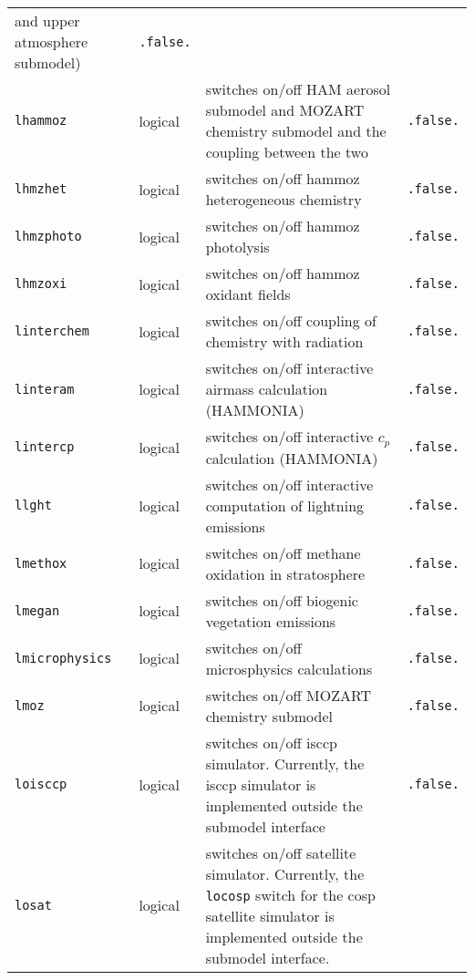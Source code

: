 \begin{longtable}{l@{\extracolsep\fill}lp{5.0cm}p{3.0cm}}
  and upper atmosphere submodel) & {\tt .false.} \\
{\tt lhammoz}\index{namelist variables!lhammoz}
 & logical & switches on/off HAM aerosol submodel and
  MOZART chemistry submodel and the coupling between the two &
  {\tt .false.} \\
{\tt lhmzhet}\index{namelist variables!lhmzhet}
 & logical & switches on/off hammoz heterogeneous chemistry &
  {\tt .false.} \\
{\tt lhmzphoto}\index{namelist variables!lhmzphoto}
 & logical & switches on/off hammoz photolysis &
  {\tt .false.} \\
{\tt lhmzoxi}\index{namelist variables!lhmzoxi}
 & logical & switches on/off hammoz oxidant fields &
  {\tt .false.} \\
{\tt linterchem}\index{namelist variables!linterchem}
 & logical & switches on/off coupling of chemistry
  with radiation & {\tt .false.} \\
{\tt linteram}\index{namelist variables!linteram}
 & logical &
  switches on/off interactive airmass calculation (HAMMONIA)
  & {\tt .false.} \\
{\tt lintercp}\index{namelist variables!lintercp}
 & logical & switches on/off interactive $c_p$
  calculation (HAMMONIA) 
  & {\tt .false.} \\
{\tt llght}\index{namelist variables!llght}
 & logical & switches on/off interactive computation of
  lightning emissions & {\tt .false.} \\
{\tt lmethox}\index{namelist variables!lmethox}
 & logical & switches on/off methane oxidation in stratosphere &
  {\tt .false.} \\
{\tt lmegan}\index{namelist variables!lmegan}
 & logical & switches on/off biogenic vegetation emissions &
  {\tt .false.} \\
{\tt lmicrophysics}\index{namelist variables!lmicrophysics}
 & logical & switches on/off microsphysics calculations &
  {\tt .false.} \\
{\tt lmoz}\index{namelist variables!lmoz}
 & logical & switches on/off MOZART chemistry submodel &
  {\tt .false.} \\
{\tt loisccp}\index{namelist variables!loisccp}
 & logical & switches on/off isccp
  simulator. Currently, the isccp simulator is implemented outside the
  submodel interface &
  {\tt .false.} \\
{\tt losat}\index{namelist variables!losat}
 & logical & switches on/off satellite
  simulator. Currently, the {\tt locosp} switch for the cosp satellite
  simulator is implemented outside the submodel interface.&

\end{longtable}
